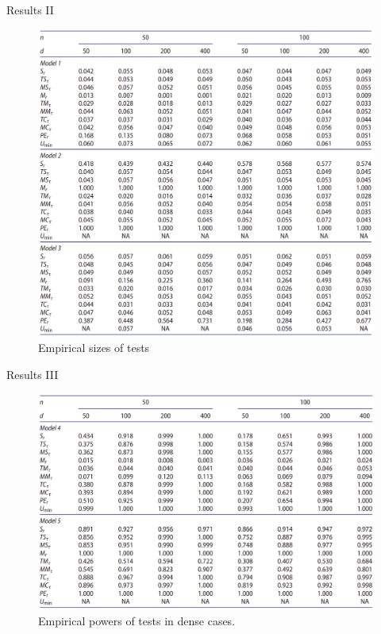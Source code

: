 \documentclass[
  ignorenonframetext,
]{beamer}
\begin{document}
\begin{frame}{Results II}
\label{results-ii}
\begin{figure}

{\centering \includegraphics[width=0.8\linewidth,height=0.77\textheight]{Figures/Table1} 

}

\caption{Empirical sizes of tests}\label{fig:Table 1}
\end{figure}
\end{frame}

\begin{frame}{Results III}
\label{results-iii}
\begin{figure}

{\centering \includegraphics[width=0.8\linewidth]{Figures/Table2} 

}

\caption{Empirical powers of tests in dense cases.}\label{fig:Table 2}
\end{figure}
\end{frame}
\end{document}
